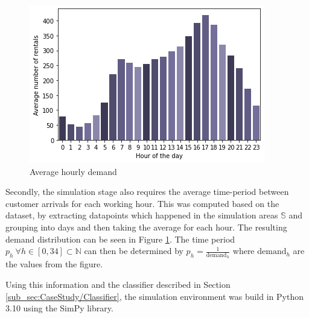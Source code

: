 \begin{figure}[htbp]
  \centering
  \includegraphics[width=.3\linewidth]{./Figures/hourly-demand.png}
  \caption{Average hourly demand}
  \label{fig:Demand}
\end{figure}

Secondly, the simulation stage also requires the average time-period between customer arrivals for each working hour.
This was computed based on the dataset, by extracting datapoints which happened in the simulation areas $\mathbb{S}$ 
and grouping into days and then taking the average for each hour. The resulting
demand distribution can be seen in Figure \ref{fig:Demand}. The time period $p_h \ \forall h \in [0, 34] \subset \mathbb{N}$
can then be determined by $p_h = \frac{1}{\text{demand}_h}$ where $\text{demand}_h$ are the values from the figure.

Using this information and the classifier described in Section \ref{sub_sec:CaseStudy/Classifier}, the simulation environment
was build in Python 3.10 using the SimPy library.
